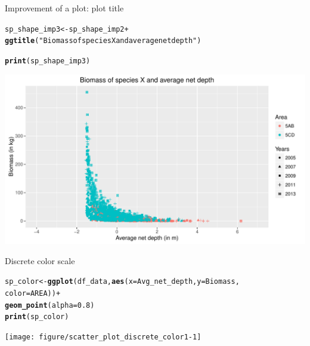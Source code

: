 \documentclass{beamer}\usepackage[]{graphicx}\usepackage[]{color}
\makeatletter
\newcommand{\hlnum}[1]{\textcolor[rgb]{0.686,0.059,0.569}{#1}}%
\newcommand{\hlstr}[1]{\textcolor[rgb]{0.192,0.494,0.8}{#1}}%
\newcommand{\hlopt}[1]{\textcolor[rgb]{0,0,0}{#1}}%
\newcommand{\hlstd}[1]{\textcolor[rgb]{0.345,0.345,0.345}{#1}}%
\newcommand{\hlkwb}[1]{\textcolor[rgb]{0.69,0.353,0.396}{#1}}%
\newcommand{\hlkwc}[1]{\textcolor[rgb]{0.333,0.667,0.333}{#1}}%
\newcommand{\hlkwd}[1]{\textcolor[rgb]{0.737,0.353,0.396}{\textbf{#1}}}%
\newenvironment{kframe}{%
 \def\at@end@of@kframe{}%
 \ifinner\ifhmode%
  \def\at@end@of@kframe{\end{minipage}}%
  \begin{minipage}{\columnwidth}%
 \fi\fi%
 \def\FrameCommand##1{\hskip\@totalleftmargin \hskip-\fboxsep
 \colorbox{shadecolor}{##1}\hskip-\fboxsep
     \hskip-\linewidth \hskip-\@totalleftmargin \hskip\columnwidth}%
 \MakeFramed {\advance\hsize-\width
   \@totalleftmargin\z@ \linewidth\hsize
   \@setminipage}}%
 {\par\unskip\endMakeFramed%
 \at@end@of@kframe}
\newenvironment{knitrout}{}{} %
\makeatother
\begin{document}
\begin{frame}[fragile]{Improvement of a plot: plot title}
\begin{knitrout}\footnotesize
{}\color{fgcolor}\begin{kframe}
\begin{alltt}
\hlstd{sp_shape_imp3} \hlkwb{<-} \hlstd{sp_shape_imp2} \hlopt{+}
  \hlkwd{ggtitle}\hlstd{(}\hlstr{"Biomass of species X and average net depth"}\hlstd{)}

\hlkwd{print}\hlstd{(sp_shape_imp3)}
\end{alltt}
\end{kframe}

{\centering \includegraphics[width=.9\linewidth]{figure/scatter_plot_shape_imp3-1} 

}



\end{knitrout}
\end{frame}


\begin{frame}[fragile]{Discrete color scale}
\begin{knitrout}\footnotesize
{}\color{fgcolor}\begin{kframe}
\begin{alltt}
\hlstd{sp_color} \hlkwb{<-} \hlkwd{ggplot}\hlstd{(df_data,} \hlkwd{aes}\hlstd{(}\hlkwc{x}\hlstd{=Avg_net_depth,} \hlkwc{y}\hlstd{=Biomass,}
                                \hlkwc{color}\hlstd{=AREA))} \hlopt{+}
  \hlkwd{geom_point}\hlstd{(}\hlkwc{alpha}\hlstd{=}\hlnum{0.8}\hlstd{)}
\hlkwd{print}\hlstd{(sp_color)}
\end{alltt}
\end{kframe}

{\centering \texttt{[image: figure/scatter\_plot\_discrete\_color1-1]} 

}



\end{knitrout}
\end{frame}
\end{document}
